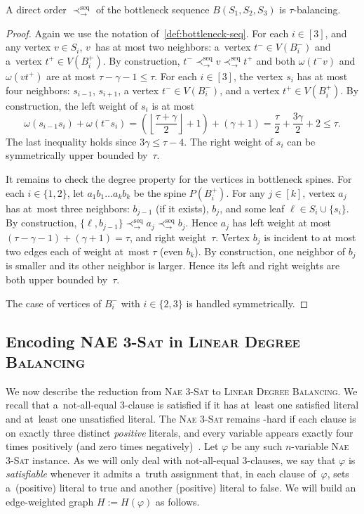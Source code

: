 \documentclass[a4paper,UKenglish,cleveref,hyperref,autoref]{lipics-v2021}
\renewcommand{\leq}{\leqslant}
\renewcommand{\le}{\leq}
\newcommand{\weight}{\omega}
\newcommand{\ldb}{\textsc{Linear Degree Balancing}\xspace}
\begin{document}
\begin{lemma}\label{lem:direct-order}
A direct order $\prec^\text{seq}_{\rightarrow}$ of the bottleneck sequence $B(S_1, S_2, S_3)$ is $\tau$-balancing.
\end{lemma}
\begin{proof}
Again we use the notation of~\cref{def:bottleneck-seq}.
For each $i \in [3]$, and any vertex $v \in S_i$, $v$~has at most two neighbors: a~vertex $t^- \in V(B_i^-)$ and a~vertex $t^+ \in V(B_i^+)$.
By construction, $t^- \prec^\text{seq}_{\rightarrow} v \prec^\text{seq}_{\rightarrow} t^+$ and both $\weight(t^-v)$ and $\weight(vt^+)$ are at most $\tau - \gamma - 1 \leqslant \tau$. 
For each $i\in [3]$, the vertex $s_i$ has at most four neighbors: $s_{i-1}$, $s_{i+1}$, a vertex $t^- \in V(B_i^-)$, and a vertex $t^+ \in V(B_i^+)$.
By construction, the left weight of $s_i$ is at most \[\weight(s_{i-1} s_i) + \weight(t^-s_i) = \left(\left\lfloor \frac{\tau + \gamma}{2} \right\rfloor + 1 \right) + (\gamma + 1) = \frac{\tau}{2} + \frac{3\gamma}{2} + 2 \le \tau.\]
The last inequality holds since $3\gamma \le \tau - 4$.
The right weight of $s_i$ can be symmetrically upper bounded by~$\tau$.

It remains to check the degree property for the vertices in bottleneck spines.
For each $i \in \{1,2\}$, let $a_1b_1 \ldots a_kb_k$ be the spine $P(B_i^+)$.
For any $j \in [k]$, vertex $a_j$ has at~most three neighbors: $b_{j-1}$ (if it exists), $b_j$, and some leaf $\ell \in S_i \cup \{s_i\}$. 
By construction, $\{\ell, b_{j-1}\} \prec^\text{seq}_{\rightarrow} a_j \prec^\text{seq}_{\rightarrow} b_j$.
Hence $a_j$ has left weight at most $(\tau - \gamma - 1) + (\gamma + 1) = \tau$, and right weight~$\tau$.
Vertex $b_j$ is incident to at most two edges each of weight at~most $\tau$ (even $b_k$).
By construction, one neighbor of $b_j$ is smaller and its other neighbor is larger.
Hence its left and right weights are both upper bounded by~$\tau$.

The case of vertices of $B_i^-$ with $i \in \{2,3\}$ is handled symmetrically.
\end{proof}

\subsection{Encoding \textsc{NAE 3-Sat} in \ldb}

We now describe the reduction from \textsc{Nae 3-Sat} to \ldb.
We recall that a~not-all-equal 3-clause is satisfied if it has at~least one satisfied literal and at~least one unsatisfied literal.
The \textsc{Nae 3-Sat} remains \NP-hard if each clause is on exactly three distinct \emph{positive} literals, and every variable appears exactly four times positively (and zero times negatively)~\cite{Darmann20}.
Let $\varphi$ be any such $n$-variable \textsc{Nae 3-Sat} instance.
As we will only deal with not-all-equal 3-clauses, we say that $\varphi$ is \emph{satisfiable} whenever it admits a~truth assignment that, in each clause of~$\varphi$, sets a~(positive) literal to true and another (positive) literal to false. 
We will build an edge-weighted graph $H := H(\varphi)$ as follows.
\end{document}
